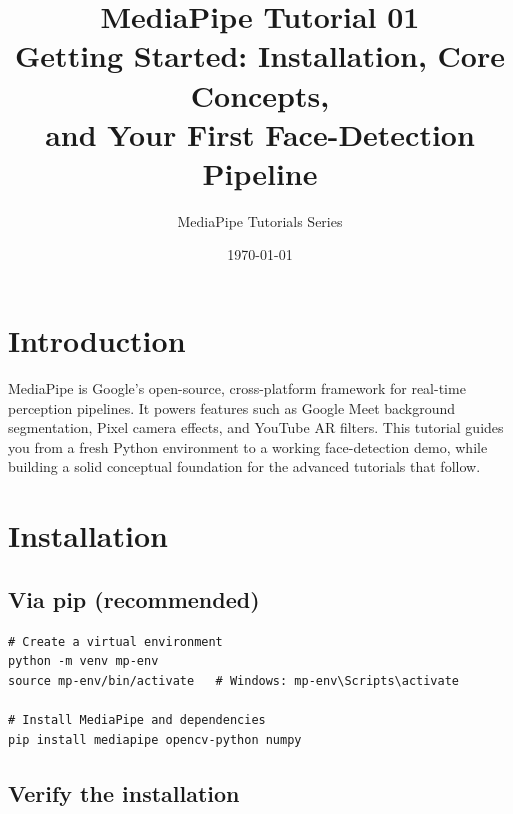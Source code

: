 \documentclass[12pt,a4paper]{article}
\begin{document}
\title{%
    \vspace{-1cm}
    \textbf{\textcolor{mpblue}{MediaPipe Tutorial 01}}\\[0.4em]
    \large Getting Started: Installation, Core Concepts,\\
    and Your First Face-Detection Pipeline
}
\author{MediaPipe Tutorials Series}
\date{\today}
\maketitle

\tableofcontents
\newpage

\section{Introduction}

MediaPipe is Google's open-source, cross-platform framework for real-time perception
pipelines. It powers features such as Google Meet background segmentation, Pixel camera
effects, and YouTube AR filters. This tutorial guides you from a fresh Python environment to
a working face-detection demo, while building a solid conceptual foundation for the advanced
tutorials that follow.

\section{Installation}

\subsection{Via pip (recommended)}

\begin{lstlisting}[style=bashstyle, caption={Installing MediaPipe via pip}]
# Create a virtual environment
python -m venv mp-env
source mp-env/bin/activate   # Windows: mp-env\Scripts\activate

# Install MediaPipe and dependencies
pip install mediapipe opencv-python numpy
\end{lstlisting}

\subsection{Verify the installation}
\end{document}
